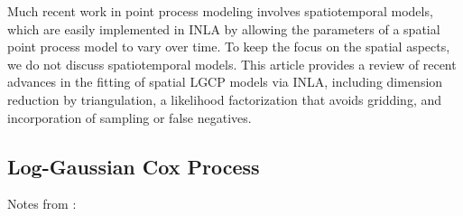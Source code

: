 \documentclass[]{interact}
\begin{document}
Much recent work in point process modeling involves spatiotemporal models,
which are easily implemented in INLA by allowing the parameters of a spatial
point process model to vary over time. To keep the focus on the spatial
aspects, we do not discuss spatiotemporal models. This article provides a
review of recent advances in the fitting of spatial LGCP models via INLA,
including dimension reduction by triangulation, a likelihood factorization that
avoids gridding, and incorporation of sampling or false negatives.


\subsection{Log-Gaussian Cox Process}

Notes from \cite{moellerwaagepetersen}:
\end{document}
